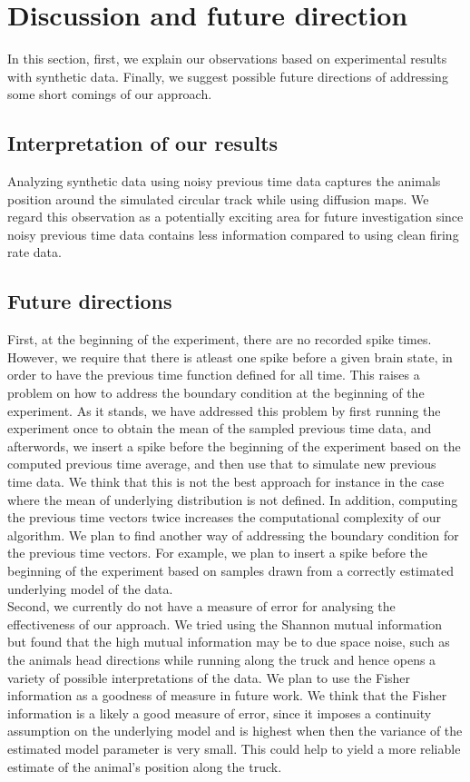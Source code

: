 \section{Discussion and future direction}
In this section, first, we explain our observations based on experimental results with synthetic data.  Finally, we suggest possible future directions of addressing some short comings of our approach.


\subsection{Interpretation of our results}
Analyzing synthetic data using noisy previous time data captures the animals position around the simulated circular track 
while using diffusion maps. We regard this observation as a potentially exciting area for future investigation since noisy 
previous time data contains less information compared to using clean firing rate data.

\subsection{Future directions}
First, at the beginning of the experiment, there are no recorded spike times.
However, we require that there is atleast one spike before a given brain state, in order to have the previous time function defined for all time. This raises a problem on how to address the boundary condition at the beginning
of the experiment. As it stands, we have addressed this problem by first running the experiment once to obtain the mean of the sampled previous time data, and afterwords, we insert a spike before the beginning of the experiment based on the computed previous time average, and then use that to simulate new  previous time data. We think that this is not the best approach for instance in the case where the mean of underlying distribution is not defined. In addition, computing the previous time vectors twice increases the computational complexity of our algorithm. We plan to find another way of addressing the boundary condition for the previous time vectors. For example, we plan to insert a spike before the beginning of the experiment based on samples drawn from a correctly estimated underlying model of the data.\\

Second, we currently do not have a measure of error for analysing the  effectiveness of our approach. 
We tried using the Shannon mutual information but found that the high  mutual information may be to due space noise, such as the animals head directions while running along the truck and hence opens a variety of possible interpretations of the data.  We plan to use the Fisher information as a goodness of measure in future work. We think that the Fisher information is a likely a good measure of error, since it imposes a continuity assumption on the underlying model and is highest when then the variance of the estimated model parameter is very small. This could help to yield a more reliable estimate of the animal's position along the truck. \\

